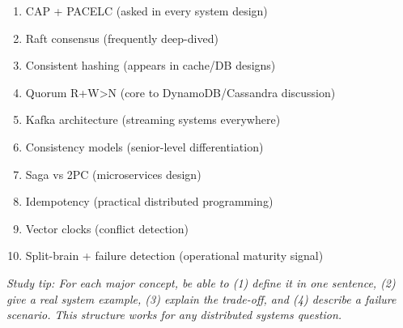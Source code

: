 \documentclass[11pt]{article}
\providecommand{\tightlist}{\setlength{\itemsep}{1pt}\setlength{\parskip}{0pt}}
\begin{document}
\begin{enumerate}
\def\labelenumi{\arabic{enumi}.}
\tightlist
\item
  CAP + PACELC (asked in every system design)
\item
  Raft consensus (frequently deep-dived)
\item
  Consistent hashing (appears in cache/DB designs)
\item
  Quorum R+W\textgreater N (core to DynamoDB/Cassandra discussion)
\item
  Kafka architecture (streaming systems everywhere)
\item
  Consistency models (senior-level differentiation)
\item
  Saga vs 2PC (microservices design)
\item
  Idempotency (practical distributed programming)
\item
  Vector clocks (conflict detection)
\item
  Split-brain + failure detection (operational maturity signal)
\end{enumerate}

\emph{Study tip: For each major concept, be able to (1) define it in one sentence, (2) give a real system example, (3) explain the trade-off, and (4) describe a failure scenario. This structure works for any distributed systems question.}
\end{document}
